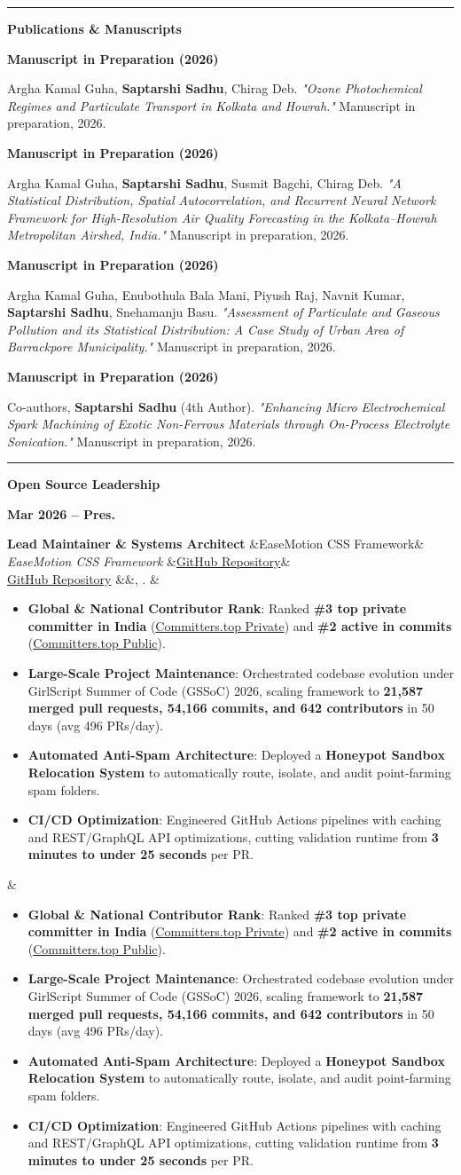 \documentclass[11pt,a4paper]{article}
\newlength{\hintscolumnwidth}
\newlength{\separatorcolumnwidth}
\newlength{\maincolumnwidth}
\newcommand{\cvsection}[1]{%
  \par\vspace{10pt}%
  \needspace{5\baselineskip}%
  \phantomsection
  \noindent
  \begin{minipage}[t]{\hintscolumnwidth}
    \raggedleft
    \color{cvblue}\rule[0.3ex]{\linewidth}{3.5pt}%
  \end{minipage}%
  \hspace{\separatorcolumnwidth}%
  \begin{minipage}[t]{\maincolumnwidth}
    {\raggedright\fontsize{12.5}{14.5}\selectfont\bfseries\color{cvblue} #1}
  \end{minipage}%
  \par\nopagebreak\vspace{5pt}\nopagebreak%
}
\newcommand{\cvitem}[2]{%
  \vspace{3pt}%
  \noindent
  \begin{minipage}[t]{\hintscolumnwidth}
    \raggedleft\small\bfseries\color{cvdark} #1
  \end{minipage}%
  \hspace{\separatorcolumnwidth}%
  \begin{minipage}[t]{\maincolumnwidth}
    \raggedright\sloppy\color{cvdark} #2
  \end{minipage}%
  \par\vspace{3pt}%
}
\newcommand{\cventry}[6]{%
  \vspace{4pt}%
  \noindent
  \begin{minipage}[t]{\hintscolumnwidth}
    \raggedleft\small\bfseries\color{cvdark} #1
  \end{minipage}%
  \hspace{\separatorcolumnwidth}%
  \begin{minipage}[t]{\maincolumnwidth}
    \raggedright\sloppy
    {\bfseries #2}%
    \ifx&#3&\else\\[1.5pt]\textit{#3}\fi%
    \ifx&#4&\else\\[1.5pt]#4\fi%
    \ifx&#5&\else, #5\fi.%
    \ifx&#6&\else\\[2.5pt]{\color{cvdark} #6}\fi
  \end{minipage}%
  \par\vspace{4pt}%
}
\begin{document}
\cvsection{Publications \& Manuscripts}

\cvitem{Manuscript in Preparation (2026)}{%
Argha Kamal Guha, \textbf{Saptarshi Sadhu}, Chirag Deb. \textit{"Ozone Photochemical Regimes and Particulate Transport in Kolkata and Howrah."} Manuscript in preparation, 2026.
}

\cvitem{Manuscript in Preparation (2026)}{%
Argha Kamal Guha, \textbf{Saptarshi Sadhu}, Susmit Bagchi, Chirag Deb. \textit{"A Statistical Distribution, Spatial Autocorrelation, and Recurrent Neural Network Framework for High-Resolution Air Quality Forecasting in the Kolkata--Howrah Metropolitan Airshed, India."} Manuscript in preparation, 2026.
}

\cvitem{Manuscript in Preparation (2026)}{%
Argha Kamal Guha, Enubothula Bala Mani, Piyush Raj, Navnit Kumar, \textbf{Saptarshi Sadhu}, Snehamanju Basu. \textit{"Assessment of Particulate and Gaseous Pollution and its Statistical Distribution: A Case Study of Urban Area of Barrackpore Municipality."} Manuscript in preparation, 2026.
}

\cvitem{Manuscript in Preparation (2026)}{%
Co-authors, \textbf{Saptarshi Sadhu} (4th Author). \textit{"Enhancing Micro Electrochemical Spark Machining of Exotic Non-Ferrous Materials through On-Process Electrolyte Sonication."} Manuscript in preparation, 2026.
}

\cvsection{Open Source Leadership}

\cventry{Mar 2026 -- Pres.}{Lead Maintainer \& Systems Architect}{EaseMotion CSS Framework}{\href{https://github.com/SAPTARSHI-coder/EaseMotion-css}{GitHub Repository}}{}{%
\begin{itemize}
    \item \textbf{Global \& National Contributor Rank}: Ranked \textbf{\#3 top private committer in India} (\href{https://committers.top/india_private}{Committers.top Private}) and \textbf{\#2 active in commits} (\href{https://committers.top/india_public}{Committers.top Public}).
    \item \textbf{Large-Scale Project Maintenance}: Orchestrated codebase evolution under GirlScript Summer of Code (GSSoC) 2026, scaling framework to \textbf{21,587 merged pull requests, 54,166 commits, and 642 contributors} in 50 days (avg 496 PRs/day).
    \item \textbf{Automated Anti-Spam Architecture}: Deployed a \textbf{Honeypot Sandbox Relocation System} to automatically route, isolate, and audit point-farming spam folders.
    \item \textbf{CI/CD Optimization}: Engineered GitHub Actions pipelines with caching and REST/GraphQL API optimizations, cutting validation runtime from \textbf{3 minutes to under 25 seconds} per PR.
\end{itemize}
}
\end{document}
